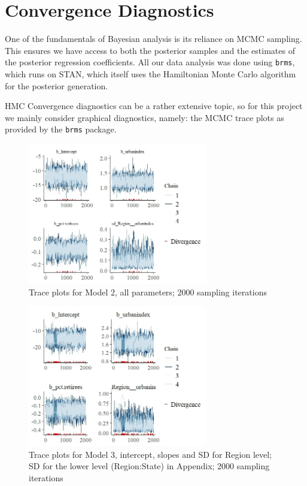 \documentclass[12pt]{article}
\newcommand{\blue}[1]{\textcolor{blue}{#1}}
\begin{document}
\FloatBarrier
\section{Convergence Diagnostics}

One of the fundamentals of Bayesian analysis is its reliance on MCMC sampling. This ensures we have access to both the posterior samples and the estimates of the posterior regression coefficients. All our data analysis was done using \verb|brms|, which runs on STAN, which itself uses the Hamiltonian Monte Carlo algorithm for the posterior generation. 


HMC Convergence diagnostics can be a rather extensive topic, so for this project we mainly consider graphical diagnostics, namely: the MCMC trace plots as provided by the \texttt{brms} package.

\begin{figure}
	\centering
	\includegraphics[width=0.7\textwidth]{trace_plots/trace_model2.jpeg}
	\caption{Trace plots for Model 2, all parameters; 2000 sampling iterations}
	\label{fig:trace_mod2}
\end{figure}


\begin{figure}
	\centering
	\includegraphics[width=0.7\textwidth]{trace_plots/trace_model3_part1.jpeg}
	\caption{Trace plots for Model 3, intercept, slopes and SD for Region level; SD for the lower level (Region:State) in Appendix; 2000 sampling iterations}
	\label{fig:trace_mod3_p1}
\end{figure}
\end{document}
